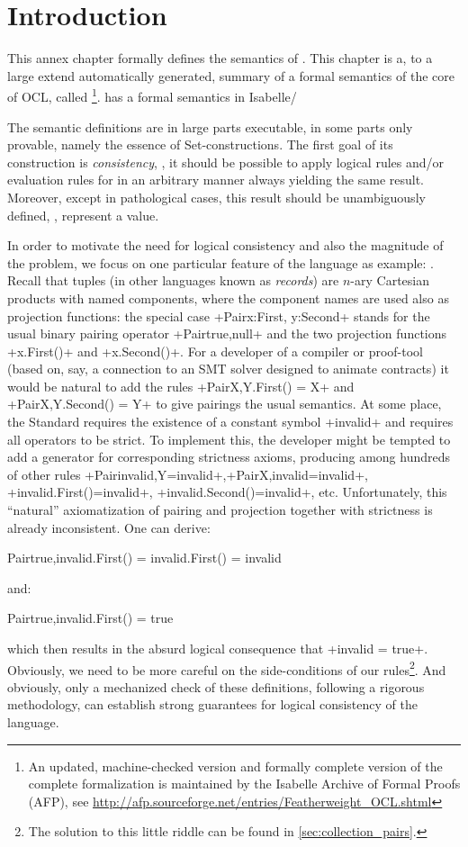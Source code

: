 \section{Introduction}
This annex chapter formally defines the semantics of \OCL. This
chapter is a, to a large extend automatically generated, summary of a
formal semantics of the core of OCL, called \FOCL\footnote{An updated,
  machine-checked version and formally complete version of the
  complete formalization is maintained by the Isabelle Archive of
  Formal Proofs (AFP), see
  \url{http://afp.sourceforge.net/entries/Featherweight_OCL.shtml}}. \FOCL
has a formal semantics in Isabelle/\HOL~\cite{nipkow.ea:isabelle:2002}

The semantic definitions are in large parts executable, in some parts
only provable, namely the essence of Set-constructions. The first goal
of its construction is \emph{consistency}, \ie, it should be possible
to apply logical rules and/or evaluation rules for \OCL in an
arbitrary manner always yielding the same result. Moreover, except in
pathological cases, this result should be unambiguously defined, \ie,
represent a value.

In order to motivate the need for logical consistency and also the
magnitude of the problem, we focus on one particular feature of the
language as example: . Recall that tuples (in other
languages known as \emph{records}) are $n$-ary Cartesian products with
named components, where the component names are used also as
projection functions: the special case %
\inlineocl+Pair{x:First, y:Second}+ stands for the usual binary
pairing operator \inlineocl+Pair{true,null}+ and the two projection
functions \inlineocl+x.First()+ and \inlineocl+x.Second()+. For a
developer of a compiler or proof-tool (based on, say, a connection to
an SMT solver designed to animate \OCL contracts) it would be natural
to add the rules \inlineocl+Pair{X,Y}.First() = X+ and
\inlineocl+Pair{X,Y}.Second() = Y+ to give pairings the usual
semantics. At some place, the \OCL Standard requires the existence of
a constant symbol \inlineocl+invalid+ and requires all operators to be
strict. To implement this, the developer might be tempted to add a
generator for corresponding strictness axioms, producing among
hundreds of other rules
\inlineocl+Pair{invalid,Y}=invalid+,\inlineocl+Pair{X,invalid}=invalid+,
\inlineocl+invalid.First()=invalid+,
\inlineocl+invalid.Second()=invalid+, etc.  Unfortunately, this
``natural'' axiomatization of pairing and projection together with
strictness is already inconsistent. One can derive:
\begin{ocl}
   Pair{true,invalid}.First() = invalid.First() = invalid
\end{ocl}
and:
\begin{ocl}
   Pair{true,invalid}.First() = true
\end{ocl}
which then results in the absurd logical consequence that
\inlineocl+invalid = true+. Obviously, we need to be more careful on
the side-conditions of our rules\footnote{The solution to this little
  riddle can be found in \autoref{sec:collection_pairs}.}. And
obviously, only a mechanized check of these definitions, following a
rigorous methodology, can establish strong guarantees for logical
consistency of the \OCL language.

